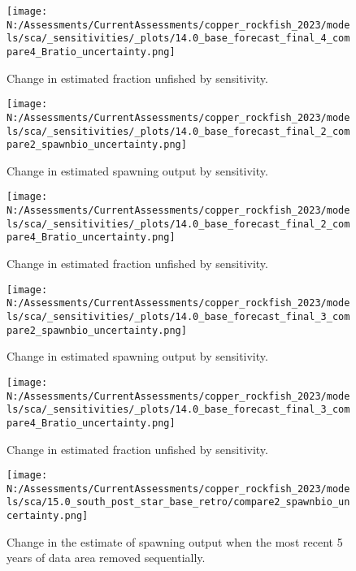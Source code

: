 \documentclass[11pt,
  english,
  letterpaper,
]{article}
\begin{document}
\newpage

\begin{figure}
\centering
\texttt{[image: N:/Assessments/CurrentAssessments/copper\_rockfish\_2023/models/sca/\_sensitivities/\_plots/14.0\_base\_forecast\_final\_4\_compare4\_Bratio\_uncertainty.png]}
\caption{Change in estimated fraction unfished by sensitivity.\label{fig:sens-depl-4}}
\end{figure}

\newpage

\begin{figure}
\centering
\texttt{[image: N:/Assessments/CurrentAssessments/copper\_rockfish\_2023/models/sca/\_sensitivities/\_plots/14.0\_base\_forecast\_final\_2\_compare2\_spawnbio\_uncertainty.png]}
\caption{Change in estimated spawning output by sensitivity.\label{fig:sens-ssb-2}}
\end{figure}

\newpage

\begin{figure}
\centering
\texttt{[image: N:/Assessments/CurrentAssessments/copper\_rockfish\_2023/models/sca/\_sensitivities/\_plots/14.0\_base\_forecast\_final\_2\_compare4\_Bratio\_uncertainty.png]}
\caption{Change in estimated fraction unfished by sensitivity.\label{fig:sens-depl-2}}
\end{figure}

\newpage

\begin{figure}
\centering
\texttt{[image: N:/Assessments/CurrentAssessments/copper\_rockfish\_2023/models/sca/\_sensitivities/\_plots/14.0\_base\_forecast\_final\_3\_compare2\_spawnbio\_uncertainty.png]}
\caption{Change in estimated spawning output by sensitivity.\label{fig:sens-ssb-3}}
\end{figure}

\newpage

\begin{figure}
\centering
\texttt{[image: N:/Assessments/CurrentAssessments/copper\_rockfish\_2023/models/sca/\_sensitivities/\_plots/14.0\_base\_forecast\_final\_3\_compare4\_Bratio\_uncertainty.png]}
\caption{Change in estimated fraction unfished by sensitivity.\label{fig:sens-depl-3}}
\end{figure}

\newpage

\begin{figure}
\centering
\texttt{[image: N:/Assessments/CurrentAssessments/copper\_rockfish\_2023/models/sca/15.0\_south\_post\_star\_base\_retro/compare2\_spawnbio\_uncertainty.png]}
\caption{Change in the estimate of spawning output when the most recent 5 years of data area removed sequentially.\label{fig:retro-ssb}}
\end{figure}
\end{document}

